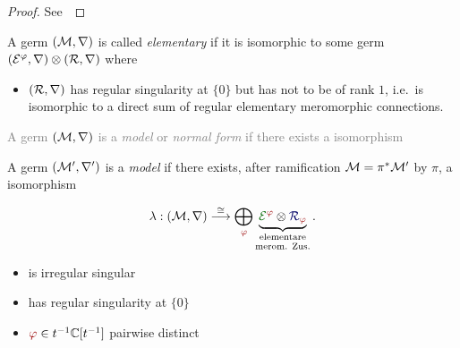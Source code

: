 \begin{proof}
  See~\cite[Prop.II.5.1]{sabbah2007isomonodromic}
\end{proof}
\begin{defn}
  A germ $(\mathcal{M},\nabla)$ is called \emph{elementary} if it is isomorphic to
  some germ $(\mathcal{E}^\varphi,\nabla)\otimes(\mathcal{R},\nabla)$ where
  \begin{itemize}
    \item $(\mathcal{R},\nabla)$ has regular singularity at $\{0\}$ but has not to be
      of rank $1$, i.e.\ is isomorphic to a direct sum of regular elementary
      meromorphic connections.
  \end{itemize}
\end{defn}
\begin{defn}\label{defn:model}
  \def\myPhi{\textcolor{red!60!black}{\phi}}
  \def\myE{\textcolor{green!40!black}{\cE^{\myPhi}}}
  \begin{multicols}{2}
    \textcolor{gray}{%
      A germ $(\mathcal{M},\nabla)$ is a \emph{model} or \emph{normal form} if there
      exists a isomorphism}

    \columnbreak{}

    A germ $(\mathcal{M}',\nabla')$ is a \emph{model} if there exists, after
    ramification $\mathcal{M}=\pi^*\mathcal{M}'$ by $\pi$, a isomorphism
  \end{multicols}
  \begin{multicols}{2}
    \[
      \lambda:(\cM,\nabla)
      \overset{\cong}{\longrightarrow}
      \bigoplus_{~\tikzmark{e3}\!\!\myPhi}
      \underset{\text{merom. Zus.}}{%
        \underset{\text{elementare}}{%
          \underbrace{%
            \overset{\tikzmark{e2}}{\myE}
            \otimes
            \overset{\tikzmark{e1}}{\textcolor{blue!40!black}{\cR_{\myPhi}}}
          }
        }
      }\,.
    \]
    \columnbreak{}
    \begin{itemize}
      \item[\tikzmarkb{n2}{green}] is irregular singular
      \item[\tikzmarkc{n1}{blue}] has regular singularity at $\{0\}$
      \item[\tikzmarkc{n3}{red}] $\myPhi\in t^{-1}\C[t^{-1}]$ pairwise distinct
    \end{itemize}
  \end{multicols}
\end{defn}
